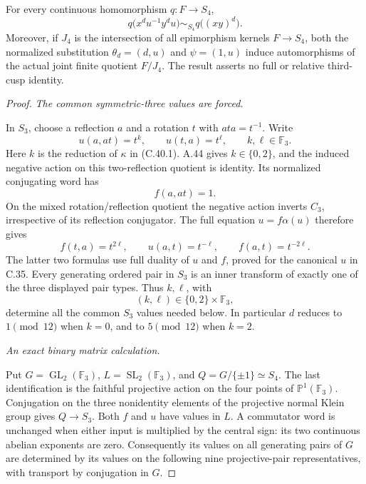For every continuous homomorphism \(q:F\to S_4\),
\[
 q\bigl(x^d u^{-1}y^d u\bigr)\sim_{S_4}q\bigl((xy)^d\bigr).
 \tag{C.40.2}
\]
Moreover, if \(J_4\) is the intersection of all epimorphism
kernels \(F\to S_4\), both the normalized substitution
\(\theta_d=(d,u)\) and \(\psi=(1,u)\) induce automorphisms
of the actual joint finite quotient \(F/J_4\).
The result asserts no full or relative third-cusp identity.

\begin{proof}
\emph{The common symmetric-three values are forced.}\par
In \(S_3\), choose a reflection \(a\) and a rotation \(t\)
with \(ata=t^{-1}\). Write
\[
       u(a,at)=t^k,\qquad u(t,a)=t^\ell,\qquad
                  k,\ell\in\mathbb F_3.
\]
Here \(k\) is the reduction of \(\kappa\) in (C.40.1).
A.44 gives \(k\in\{0,2\}\), and the induced negative action
on this two-reflection quotient is identity. Its normalized
conjugating word has
\[
                          f(a,at)=1.
\]
On the mixed rotation/reflection quotient the negative action
inverts \(C_3\), irrespective of its reflection conjugator.
The full equation \(u=f\alpha(u)\) therefore gives
\[
 f(t,a)=t^{2\ell},\qquad
 u(a,t)=t^{-\ell},\qquad f(a,t)=t^{-2\ell}.
 \tag{C.40.3}
\]
The latter two formulas use full duality of \(u\) and \(f\),
proved for the canonical \(u\) in C.35. Every generating
ordered pair in \(S_3\) is an inner transform of exactly one
of the three displayed pair types. Thus \(k,\ell\), with
\[
              (k,\ell)\in\{0,2\}\times\mathbb F_3,
 \tag{C.40.4}
\]
determine all the common \(S_3\) values needed below.
In particular \(d\) reduces to \(1\pmod{12}\) when \(k=0\),
and to \(5\pmod{12}\) when \(k=2\).

\emph{An exact binary matrix calculation.}\par
Put \(G=\operatorname{GL}_2(\mathbb F_3)\),
\(L=\operatorname{SL}_2(\mathbb F_3)\), and
\(Q=G/\{\pm1\}\simeq S_4\). The last identification is
the faithful projective action on the four points of
\(\mathbb P^1(\mathbb F_3)\). Conjugation on the three
nonidentity elements of the projective normal Klein group
gives \(Q\to S_3\). Both \(f\) and \(u\) have values in
\(L\). A commutator word is unchanged when either input
is multiplied by the central sign: its two continuous
abelian exponents are zero. Consequently its values on
all generating pairs of \(G\) are determined by its values
on the following nine projective-pair representatives,
with transport by conjugation in \(G\).


\end{proof}
